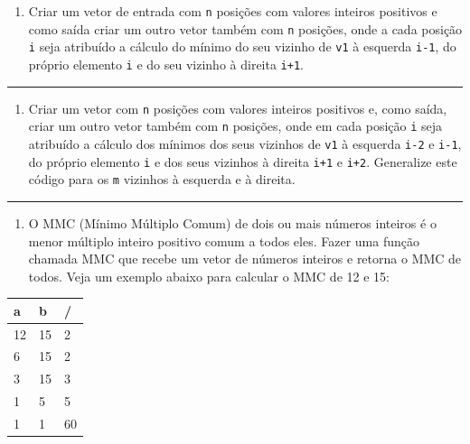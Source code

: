 \documentclass[12pt,a4paper]{article}
\renewcommand{\linethickness}{0.05em}
\providecommand{\tightlist}{%
      \setlength{\itemsep}{0pt}\setlength{\parskip}{0pt}}
\begin{document}
\begin{enumerate}
\def\labelenumi{\arabic{enumi}.}
\tightlist
\item
  Criar um vetor de entrada com \texttt{n} posições com valores inteiros
  positivos e como saída criar um outro vetor também com \texttt{n}
  posições, onde a cada posição \texttt{i} seja atribuído a cálculo do
  mínimo do seu vizinho de \texttt{v1} à esquerda \texttt{i-1}, do
  próprio elemento \texttt{i} e do seu vizinho à direita \texttt{i+1}.
\end{enumerate}

    \begin{center}\rule{0.5\linewidth}{\linethickness}\end{center}

\begin{enumerate}
\def\labelenumi{\arabic{enumi}.}
\setcounter{enumi}{1}
\tightlist
\item
  Criar um vetor com \texttt{n} posições com valores inteiros positivos
  e, como saída, criar um outro vetor também com \texttt{n} posições,
  onde em cada posição \texttt{i} seja atribuído a cálculo dos mínimos
  dos seus vizinhos de \texttt{v1} à esquerda \texttt{i-2} e
  \texttt{i-1}, do próprio elemento \texttt{i} e dos seus vizinhos à
  direita \texttt{i+1} e \texttt{i+2}. Generalize este código para os
  \texttt{m} vizinhos à esquerda e à direita.
\end{enumerate}

    \begin{center}\rule{0.5\linewidth}{\linethickness}\end{center}

\begin{enumerate}
\def\labelenumi{\arabic{enumi}.}
\setcounter{enumi}{2}
\tightlist
\item
  O MMC (Mínimo Múltiplo Comum) de dois ou mais números inteiros é o
  menor múltiplo inteiro positivo comum a todos eles. Fazer uma função
  chamada MMC que recebe um vetor de números inteiros e retorna o MMC de
  todos. Veja um exemplo abaixo para calcular o MMC de 12 e 15:
\end{enumerate}

    \begin{longtable}[]{@{}lll@{}}
\toprule
a & b & /\tabularnewline
\midrule
\endhead
12 & 15 & 2\tabularnewline
6 & 15 & 2\tabularnewline
3 & 15 & 3\tabularnewline
1 & 5 & 5\tabularnewline
1 & 1 & 60\tabularnewline
\bottomrule
\end{longtable}
\end{document}
